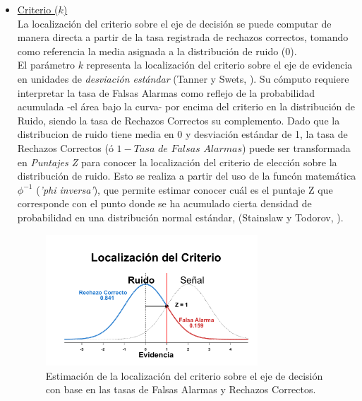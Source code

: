\begin{itemize}
\item \underline{Criterio ($k$)}\\

La localización del criterio sobre el eje de decisión se puede computar de manera directa a partir de la tasa registrada de rechazos correctos, tomando como referencia la media asignada a la distribución de ruido ($0$). \\

El parámetro $k$ representa la localización del criterio sobre el eje de evidencia en unidades de \textit{desviación estándar} (Tanner y Swets, \citeyear{Tanner1954}). Su cómputo requiere interpretar la tasa de Falsas Alarmas como reflejo de la probabilidad acumulada -el área bajo la curva- por encima del criterio en la distribución de Ruido, siendo la tasa de Rechazos Correctos su complemento. Dado que la distribucion de ruido tiene media en 0 y desviación estándar de 1, la tasa de Rechazos Correctos (ó $1 - Tasa$ $de$ $Falsas$ $Alarmas$) puede ser transformada en \textit{Puntajes Z} para conocer la localización del criterio de elección sobre la distribución de ruido. Esto se realiza a partir del uso de la funcón matemática $\phi^{-1}$ (\textit{'phi inversa'}), que permite estimar conocer cuál es el puntaje Z que corresponde con el punto donde se ha acumulado cierta densidad de probabilidad en una distribución normal estándar, (Stainslaw y Todorov, \citeyear{Stainslaw1999}).\\

\begin{figure}[h]
\centering
\includegraphics[width=0.75\textwidth]{Figures/Graficador_CriterioR} 
\caption[Estimación paramétrica: La localización del criterio]{Estimación de la localización del criterio sobre el eje de decisión con base en las tasas de Falsas Alarmas y Rechazos Correctos.}
\label{fig:Graf_Criterio}
\end{figure}


\end{itemize}
